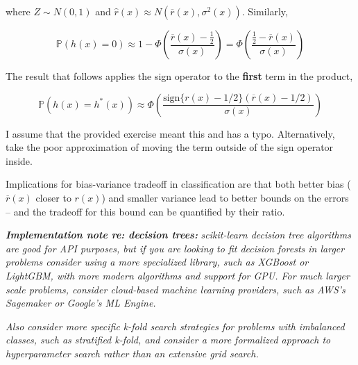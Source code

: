 where \(Z \sim N(0, 1)\) and
\(\hat{r}(x) \approx N(\overline{r}(x), \sigma^{2}(x))\). Similarly,

\[ \mathbb{P}(h(x) = 0) \approx 1 - \Phi\left( \frac{\overline{r}(x) - \frac{1}{2}}{\sigma(x)} \right) = \Phi\left( \frac{\frac{1}{2} - \overline{r}(x)}{\sigma(x)} \right)\]

The result that follows applies the sign operator to the \textbf{first}
term in the product,

\[ \mathbb{P}(h(x) = h^*(x)) \approx \Phi \left( \frac{\text{sign} \Big\{ r(x) - 1/2 \Big\} (\overline{r}(x) - 1/2) }{\sigma(x)} \right) \]

I assume that the provided exercise meant this and has a typo.
Alternatively, take the poor approximation of moving the term outside of
the sign operator inside.

Implications for bias-variance tradeoff in classification are that both
better bias (\(\overline{r}(x)\) closer to \(r(x)\)) and smaller
variance lead to better bounds on the errors -- and the tradeoff for
this bound can be quantified by their ratio.

\textbf{\emph{Implementation note re: decision trees:}}
\emph{scikit-learn decision tree algorithms are good for API purposes,
but if you are looking to fit decision forests in larger problems
consider using a more specialized library, such as XGBoost or LightGBM,
with more modern algorithms and support for GPU. For much larger scale
problems, consider cloud-based machine learning providers, such as AWS's
Sagemaker or Google's ML Engine.}

\emph{Also consider more specific k-fold search strategies for problems
with imbalanced classes, such as stratified k-fold, and consider a more
formalized approach to hyperparameter search rather than an extensive
grid search.}
